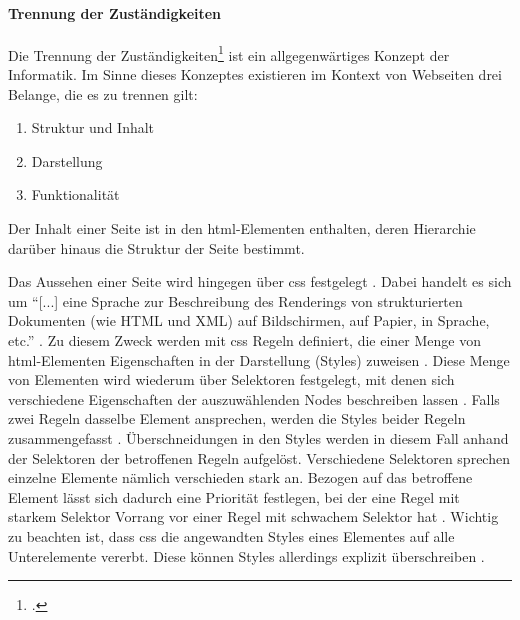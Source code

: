        \paragraph*{Trennung der Zuständigkeiten}
        Die Trennung der Zuständigkeiten\footcite[vgl.][]{huersch:SeparationOfConcerns}
        ist ein allgegenwärtiges Konzept der Informatik.
        Im Sinne dieses Konzeptes existieren im Kontext von Webseiten
        drei Belange, die es zu trennen gilt:

        \begin{enumerate}
            \item Struktur und Inhalt
            \item Darstellung
            \item Funktionalität
        \end{enumerate}

        Der Inhalt einer Seite ist in den \gls{html}-Elementen enthalten,
        deren Hierarchie darüber hinaus die Struktur der Seite bestimmt.
        
        Das Aussehen einer Seite wird hingegen über \gls{css} festgelegt \cite{w3c:css}.
        Dabei handelt es sich um "`[...] eine Sprache zur Beschreibung des Renderings
        von strukturierten Dokumenten (wie HTML und XML) auf Bildschirmen, auf Papier,
        in Sprache, etc."' \cite{w3c:css}.
        Zu diesem Zweck werden mit \gls{css} Regeln definiert,
        die einer Menge von \gls{html}-Elementen Eigenschaften in der Darstellung (Styles) zuweisen
        \cite{w3c:cssSyntax}.
        Diese Menge von Elementen wird wiederum über Selektoren festgelegt,
        mit denen sich verschiedene Eigenschaften der auszuwählenden Nodes beschreiben lassen
        \cite{w3c:cssSelectors}.
        Falls zwei Regeln dasselbe Element ansprechen,
        werden die Styles beider Regeln zusammengefasst
        \cite{w3c:cssCascading}.
        Überschneidungen in den Styles werden in diesem Fall anhand der Selektoren der betroffenen Regeln aufgelöst.
        Verschiedene Selektoren sprechen einzelne Elemente nämlich verschieden stark an.
        Bezogen auf das betroffene Element lässt sich dadurch eine Priorität festlegen,
        bei der eine Regel mit starkem Selektor Vorrang vor einer Regel mit schwachem Selektor hat
        \cite{w3c:cssSelectors}. 
        Wichtig zu beachten ist, dass \gls{css} die angewandten Styles eines Elementes auf alle Unterelemente vererbt.
        Diese können Styles allerdings explizit überschreiben
        \cite{w3c:cssCascading}.
        
